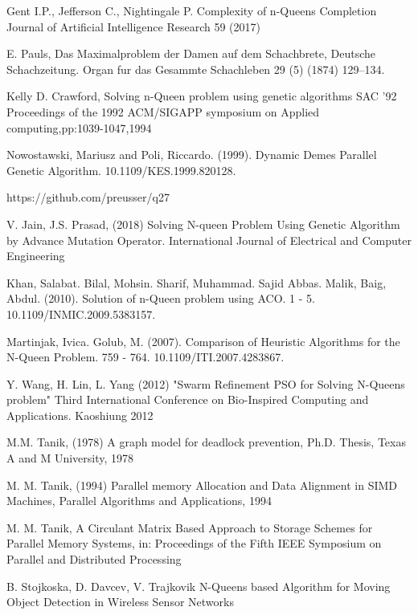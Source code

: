 \documentclass[a4paper,onecolumn,11pt]{article}
\begin{document}
\begin{thebibliography}{99.}

 Gent I.P., Jefferson C., Nightingale P. 	Complexity of n-Queens Completion Journal of Artificial Intelligence Research 59 (2017) 

 E. Pauls, Das Maximalproblem der Damen auf dem Schachbrete, Deutsche Schachzeitung. Organ fur das Gesammte Schachleben 29 (5) (1874) 129–134.

 Kelly D. Crawford, Solving n-Queen problem using genetic algorithms SAC '92 Proceedings of the 1992 ACM/SIGAPP symposium on Applied computing,pp:1039-1047,1994 

 Nowostawski, Mariusz and Poli, Riccardo. (1999). Dynamic Demes Parallel Genetic Algorithm. 10.1109/KES.1999.820128. 

 https://github.com/preusser/q27

 V. Jain, J.S. Prasad, (2018) Solving N-queen Problem Using Genetic Algorithm by Advance Mutation Operator. International Journal of Electrical and Computer Engineering

 Khan, Salabat. Bilal, Mohsin. Sharif, Muhammad. Sajid Abbas. Malik, Baig, Abdul. (2010). Solution of n-Queen problem using ACO. 1 - 5. 10.1109/INMIC.2009.5383157. 

 Martinjak, Ivica. Golub, M. (2007). Comparison of Heuristic Algorithms for the N-Queen Problem. 759 - 764. 10.1109/ITI.2007.4283867.

  Y. Wang, H. Lin, L. Yang (2012) "Swarm Refinement PSO for Solving N-Queens problem" Third International Conference on Bio-Inspired Computing and Applications. Kaoshiung 2012

 M.M. Tanik, (1978) A graph model for deadlock prevention, Ph.D. Thesis, Texas A and M University, 1978

 M. M. Tanik, (1994) Parallel memory Allocation and Data Alignment in SIMD Machines, Parallel Algorithms and Applications, 1994

 M. M. Tanik, A Circulant Matrix Based Approach to Storage Schemes for Parallel Memory Systems,  in: Proceedings of the Fifth IEEE Symposium on Parallel and Distributed Processing

 B. Stojkoska, D. Davcev, V. Trajkovik N-Queens based Algorithm for Moving Object Detection in Wireless Sensor Networks


\end{thebibliography}
\end{document}
